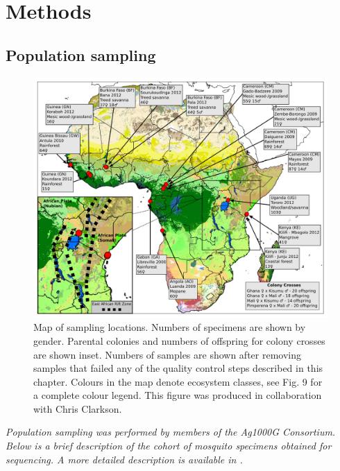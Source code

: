 \documentclass[a4paper,11pt,abstracton,hidelinks]{scrartcl}
\begin{document}
\section{Methods}


\subsection{Population sampling}


\begin{figure}[t!]
\centering
\includegraphics[width=\textwidth]{artwork/chapter3/map.jpeg}
\caption{Map of sampling locations.
%
Numbers of specimens are shown by gender.
%
Parental colonies and numbers of offspring for colony crosses are shown inset.
%
Numbers of samples are shown after removing samples that failed any of the quality control steps described in this chapter. 
%
Colours in the map denote ecosystem classes, see \citet{Sayre2013} Fig. 9 for a complete colour legend. 
%
This figure was produced in collaboration with Chris Clarkson.}
\label{fig:map}
\end{figure}


\textit{Population sampling was performed by members of the Ag1000G Consortium. Below is a brief description of the cohort of mosquito specimens obtained for sequencing. A more detailed description is available in \citet{Ag1000G2017}.}
\end{document}
